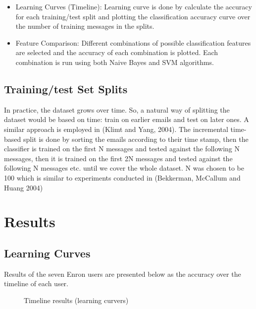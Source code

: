 \begin{itemize}
\item Learning Curves (Timeline): Learning curve is done by calculate the accuracy for each training/test split and plotting the classification accuracy curve over the number of training messages in the splits. %

\item Feature Comparison: Different combinations of possible classification features are selected and the accuracy of each combination is plotted. Each combination is run using both Naive Bayes and SVM algorithms.
\end{itemize}

\subsection{Training/test Set Splits}
In practice, the dataset grows over time. So, a natural way of splitting the dataset would be based on time: train on earlier emails and test on later ones. A similar approach is employed in (Klimt and Yang, 2004). %
The incremental time-based split is done by sorting the emails according to their time stamp, then the classifier is trained on the first N messages and tested against the following N messages, then it is trained on the first 2N messages and tested against the following N messages etc. until we cover the whole dataset. N was chosen to be 100 which is similar to experiments conducted in (Bekkerman, McCallum and Huang 2004)

\section{Results}

\subsection{Learning Curves}
Results of the seven Enron users are presented below as the accuracy over the timeline of each user.

\begin{figure}[H]
    \begin{center}
    \end{center}
    \caption{Timeline results (learning curvers)}
\end{figure}

